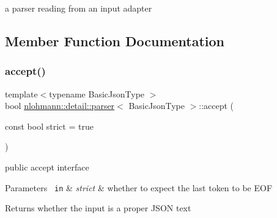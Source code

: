 a parser reading from an input adapter 



\subsection{Member Function Documentation}
\mbox{\label{classnlohmann_1_1detail_1_1parser_a20997b42262856935b60fc91bf05bf3f}} 
\subsubsection{\texorpdfstring{accept()}{accept()}}
{\footnotesize\ttfamily template$<$typename Basic\+Json\+Type $>$ \\
bool \mbox{\hyperlink{classnlohmann_1_1detail_1_1parser}{nlohmann\+::detail\+::parser}}$<$ Basic\+Json\+Type $>$\+::accept (\begin{DoxyParamCaption}\item[{const bool}]{strict = {\ttfamily true} }\end{DoxyParamCaption})\hspace{0.3cm}{\ttfamily [inline]}}



public accept interface 


\begin{DoxyParams}[1]{Parameters}
\mbox{\texttt{ in}}  & {\em strict} & whether to expect the last token to be E\+OF \\
\hline
\end{DoxyParams}
\begin{DoxyReturn}{Returns}
whether the input is a proper J\+S\+ON text 
\end{DoxyReturn}
\mbox{\label{classnlohmann_1_1detail_1_1parser_a1328166d9e9b655399fdc890d47e4990}} 

